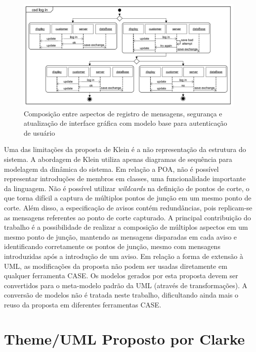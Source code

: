 \begin{figure}
	\centering
	\includegraphics[width=475px]{img/klein_composition.png}
	\caption{Composição entre aspectos de registro de mensagens, segurança e 
	atualização de interface gráfica com modelo
	base para autenticação de usuário}\label{fig:klein_composition}
\end{figure}

Uma das limitações da proposta de Klein é a não representação da estrutura do sistema. A abordagem de Klein utiliza apenas diagramas de sequência para
modelagem da dinâmica do sistema. Em relação a POA, não é possível representar introduções de membros em classes, uma funcionalidade importante da
linguagem. Não é possível utilizar \textit{wildcards} na definição de pontos de corte, o que torna difícil a captura de múltiplos pontos de junção em
um mesmo ponto de corte. Além disso, a especificação de avisos contém redundâncias, pois replicam-se as mensagens referentes ao ponto de corte
capturado. A principal contribuição do trabalho é a possibilidade de realizar a composição de múltiplos aspectos em um mesmo ponto de junção, mantendo
as mensagens disparadas em cada aviso e identificando corretamente os pontos de junção, mesmo com mensagens introduzidas após a introdução de um
aviso. Em relação a forma de extensão à UML, as modificações da proposta não podem ser usadas diretamente em qualquer ferramenta CASE. Os modelos
gerados por esta proposta devem ser convertidos para o meta-modelo padrão da UML (através de transformações). A conversão de modelos não é tratada
neste trabalho, dificultando ainda mais o reuso da proposta em diferentes ferramentas CASE.

\section{Theme/UML Proposto por Clarke}

